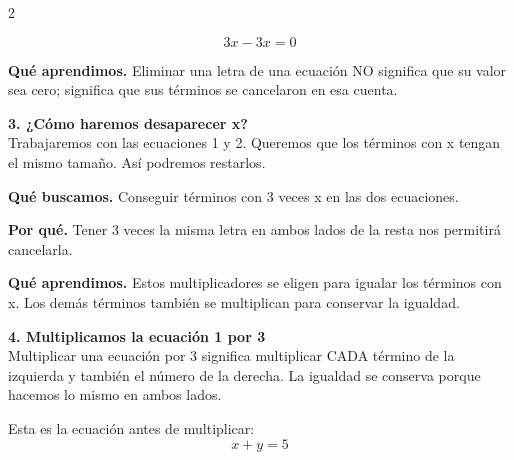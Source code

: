 \documentclass[11pt,a4paper,landscape]{article}
\begin{document}
\begin{multicols*}{2}
\begin{minipage}{\linewidth}
\[3x-3x=0\]
\par\smallskip\textbf{Qué aprendimos.} Eliminar una letra de una ecuación NO significa que su valor sea cero; significa que sus términos se cancelaron en esa cuenta.
\end{minipage}\par\medskip
\noindent\begin{minipage}{\linewidth}\textbf{3. ¿Cómo haremos desaparecer x?}\\[2pt]Trabajaremos con las ecuaciones 1 y 2. Queremos que los términos con x tengan el mismo tamaño. Así podremos restarlos.
\par\smallskip\textbf{Qué buscamos.} Conseguir términos con 3 veces x en las dos ecuaciones.
\par\smallskip\textbf{Por qué.} Tener 3 veces la misma letra en ambos lados de la resta nos permitirá cancelarla.
\par{}\par\smallskip
\par\smallskip\textbf{Qué aprendimos.} Estos multiplicadores se eligen para igualar los términos con x. Los demás términos también se multiplican para conservar la igualdad.
\end{minipage}\par\medskip
\noindent\begin{minipage}{\linewidth}\textbf{4. Multiplicamos la ecuación 1 por 3}\\[2pt]Multiplicar una ecuación por 3 significa multiplicar CADA término de la izquierda y también el número de la derecha. La igualdad se conserva porque hacemos lo mismo en ambos lados.
\par\smallskip Esta es la ecuación antes de multiplicar:
\[x + y = 5\]
\par{}\par\smallskip

\end{minipage}
\end{multicols*}
\end{document}
